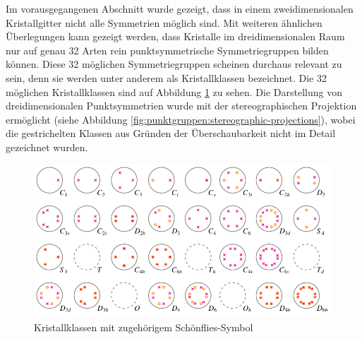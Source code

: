 Im vorausgegangenen Abschnitt wurde gezeigt, dass in einem zweidimensionalen Kristallgitter nicht alle Symmetrien möglich sind.
 Mit weiteren ähnlichen Überlegungen kann gezeigt werden, dass Kristalle im dreidimensionalen Raum nur auf genau 32 Arten rein punktsymmetrische Symmetriegruppen bilden können.
 Diese 32 möglichen Symmetriegruppen scheinen durchaus relevant zu sein, denn sie werden unter anderem als Kristallklassen bezeichnet.
 Die 32 möglichen Kristallklassen sind auf Abbildung \ref{fig:punktgruppen:kristallklassen} zu sehen.
 Die Darstellung von dreidimensionalen Punktsymmetrien wurde mit der stereographischen Projektion ermöglicht (siehe Abbildung \ref{fig:punktgruppen:stereographic-projections}), wobei die gestrichelten Klassen aus Gründen der Überschaubarkeit nicht im Detail gezeichnet wurden.


\begin{figure}
    \centering
    \includegraphics[]{papers/punktgruppen/figures/projections}
    \caption{Kristallklassen mit zugehörigem Schönflies-Symbol}
    \label{fig:punktgruppen:kristallklassen}
\end{figure}

